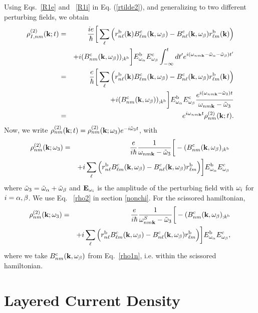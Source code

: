 \documentclass{article}
\begin{document}
Using Eqs.~\eqref{R1e} and ~\eqref{R1i} in Eq. (\ref{rtilde2}),
and generalizing to two different perturbing fields,
we obtain
\begin{eqnarray}\label{rtilde33}
{\rho}^{(2)}_{I,nm}(\mathbf{k};t)
&=&
\frac{ie}{\hbar}
\bigg[
\sum_{\ell}
\Big(
r^{\mathrm{b}}_{n\ell}(\mathbf{k})
B^{\mathrm{c}}_{\ell m}(\mathbf{k},\omega_\beta)
-
B^{\mathrm{c}}_{n\ell}(\mathbf{k},\omega_\beta)
r^{\mathrm{b}}_{\ell m}(\mathbf{k})
\Big)
\nonumber \\
&&+
i
(B^{\mathrm{c}}_{nm}(\mathbf{k},\omega_\beta))_{;k^{\mathrm{b}}}
\bigg]
E^{\mathrm{b}}_{\omega_\alpha}E_{\omega_\beta}^{\mathrm{c}}
\int_{-\infty}^t dt'
e^{i(\omega_{nm\mathbf{k}}-\tilde\omega_\alpha-\tilde\omega_\beta)t'}
\nonumber \\
&=&
\frac{e}{\hbar}
\bigg[
\sum_{\ell}
\Big(
r^{\mathrm{b}}_{n\ell}(\mathbf{k})
B^{\mathrm{c}}_{\ell m}(\mathbf{k},\omega_\beta)
-
B^{\mathrm{c}}_{n\ell}(\mathbf{k},\omega_\beta)
r^{\mathrm{b}}_{\ell m}(\mathbf{k})
\Big)
\nonumber \\
&&+
i
(B^{\mathrm{c}}_{nm}(\mathbf{k},\omega_\beta))_{;k^{\mathrm{b}}}
\bigg]
E^{\mathrm{b}}_{\omega_\alpha}E_{\omega_\beta}^{\mathrm{c}}
\frac{e^{i(\omega_{nm\mathbf{k}}-\tilde\omega_3)t}}
{\omega_{nm\mathbf{k}}-\tilde\omega_3}
\nonumber \\
&=&
e^{i\omega_{nm\mathbf{k}}t}
\rho_{nm}^{(2)}(\mathbf{k};t)
.
\end{eqnarray}
Now, we write
$\rho_{nm}^{(2)}(\mathbf{k};t)=\rho_{nm}^{(2)}(\mathbf{k};\omega_3)e^{-i\tilde\omega_3 t}$,
with
\begin{eqnarray}\label{rho2}
{\rho}_{nm}^{(2)}(\mathbf{k};\omega_3)&=&\frac{e}{i\hbar}\frac{1}{\omega_{nm\mathbf{k}}-\tilde\omega_3}
\bigg[-(B_{nm}^{\mathrm{c}}(\mathbf{k},\omega_\beta)_{;k^{\mathrm{b}}}
\nonumber \\
&&
+i\sum_\ell\Big(r_{n\ell}^{\mathrm{b}}B_{\ell m}^{\mathrm{c}}(\mathbf{k},\omega_\beta) - B_{n\ell}^{\mathrm{c}}(\mathbf{k},\omega_\beta)
  r_{\ell m}^{\mathrm{b}}\Big)
\bigg] 
E^{\mathrm{b}}_{\omega_\alpha}E_{\omega_\beta}^{\mathrm{c}}
\end{eqnarray} 
where $\tilde\omega_3=\tilde\omega_\alpha+\tilde\omega_\beta$ and $\mathbf{E}_{\omega_i}$ is the amplitude of the perturbing
field with $\omega_i$ for $i=\alpha,\beta$. We use Eq.
~\eqref{rho2} in section \ref{nonchi}. For the scissored hamiltonian,
\begin{eqnarray}\label{rho2n}
{\rho}_{nm}^{(2)}(\mathbf{k};\omega_3)&=&\frac{e}{i\hbar}\frac{1}{\omega^S_{nm\mathbf{k}}-\tilde\omega_3}
\bigg[-(B_{nm}^{\mathrm{c}}(\mathbf{k},\omega_\beta)_{;k^{\mathrm{b}}}
\nonumber \\
&&
+i\sum_\ell\Big(r_{n\ell}^{\mathrm{b}}B_{\ell m}^{\mathrm{c}}(\mathbf{k},\omega_\beta) - B_{n\ell}^{\mathrm{c}}(\mathbf{k},\omega_\beta)
  r_{\ell m}^{\mathrm{b}}\Big)
\bigg]
E^{\mathrm{b}}_{\omega_\alpha}E_{\omega_\beta}^{\mathrm{c}}
,
\end{eqnarray}
where we take $B_{nm}^{\mathrm{c}}(\mathbf{k},\omega_\beta)$ 
from Eq.~\eqref{rho1n}, i.e. within the scissored
hamiltonian. 


\section{Layered Current Density}\label{cd}
\end{document}
